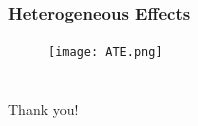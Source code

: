 \documentclass[10pt, handout]{beamer} %
\begin{document}
\frame
{
\frametitle{Heterogeneous Effects}
\vskip 0.1in  

\begin{figure}[!ht]
\centering
\texttt{[image: ATE.png]}
\end{figure}
}

\section*{}
\frame
{
\frametitle{}

\vskip 0.1in

\begin{center}
Thank you!
\end{center}
}
\end{document}
